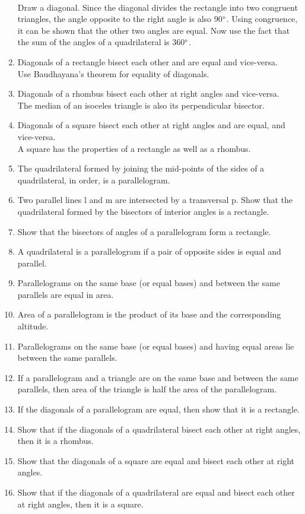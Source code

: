 \begin{enumerate}[label=\arabic*.,ref=\thesubsection.\theenumi]
%
\\
\solution Draw a diagonal.  Since the diagonal divides the rectangle into two congruent triangles, the angle opposite to the right angle is also 90$\degree$. Using congruence, it can be shown that the other two angles are equal.  Now use the fact that the sum of the angles of a quadrilateral is 360$\degree$.
%
\item  Diagonals of a rectangle bisect each other and are equal and vice-versa. 
%
\\
\solution Use Baudhayana's theorem for equality of diagonals.
%
\item  Diagonals of a rhombus bisect each other at right angles and vice-versa. 
%
\\
\solution The median of an isoceles triangle is also its perpendicular bisector.
%
\item  Diagonals of a square bisect each other at right angles and are equal, and vice-versa. 
%
\\
\solution A square has the properties of a rectangle as well as a rhombus.
%
%
\item  The quadrilateral formed by joining the mid-points of the sides of a quadrilateral, in order, is a parallelogram.
%
%
\item Two parallel lines l and m are intersected by a transversal p. Show that the quadrilateral formed by the bisectors of interior angles is a rectangle.
%
\item Show that the bisectors of angles of a parallelogram form a rectangle.
%
\item A quadrilateral is a parallelogram if a pair of opposite sides is equal and parallel.
%
\item Parallelograms on the same base (or equal bases) and between the same parallels are equal in area.
\item Area of a parallelogram is the product of its base and the corresponding altitude. 
\item Parallelograms on the same base (or equal bases) and having equal areas lie between the same parallels.
\item If a parallelogram and a triangle are on the same base and between the same parallels, then area of the triangle is half the area of the parallelogram.
%
\item If the diagonals of a parallelogram are equal, then show that it is a rectangle. 
\item Show that if the diagonals of a quadrilateral bisect each other at right angles, then it is a rhombus.
\item Show that the diagonals of a square are equal and bisect each other at right angles. 
\item Show that if the diagonals of a quadrilateral are equal and bisect each other at right angles, then it is a square.
%
\end{enumerate}
